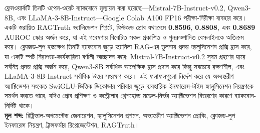 {ফ্রেমওয়ার্কটি তিনটি ওপেন-ওয়েট ব্যাকবোনে মূল্যায়ন করা হয়েছে---\textenglish{Mistral-7B-Instruct-v0.2}, \textenglish{Qwen3-8B}, এবং \textenglish{LLaMA-3-8B-Instruct}---\textenglish{Google Colab A100 FP16} পরীক্ষা-নিরীক্ষা ব্যবহার করে। একটি স্তরায়িত \textenglish{RAGTruth} ভ্যালিডেশন স্প্লিটে, ফিউজড প্রোব যথাক্রমে \textenglish{\textbf{0.8596}}, \textenglish{\textbf{0.8808}}, এবং \textenglish{\textbf{0.8689}} \textenglish{AUROC} স্কোর অর্জন করে, যা এই গবেষণায় বিবেচিত সকল প্রকাশিত ও পুনরুত্পাদিত বেসলাইনকে অতিক্রম করে। ক্লোজড-লুপ হস্তক্ষেপ তিনটি ব্যাকবোন জুড়ে ভ্যানিলা \textenglish{RAG}-এর তুলনায় প্রদত্ত হ্যালুসিনেশন প্রক্সি হ্রাস করে, যা একটি স্পষ্ট নিরাপত্তা-কার্যকারিতা বর্ণালী আচ্ছাদন করে: \textenglish{Mistral-7B-Instruct-v0.2} সুষম গ্রহণের হারে সর্বনিম্ন প্রদত্ত প্রক্সি অর্জন করে, \textenglish{Qwen3-8B} সর্বাধিক আপেক্ষিক হ্রাস প্রদান করে কিন্তু সবচেয়ে রক্ষণশীল, এবং \textenglish{LLaMA-3-8B-Instruct} সর্বাধিক উত্তর সংরক্ষণ করে। এই ফলাফলগুলো নির্দেশ করে যে অভ্যন্তরীণ অ্যাক্টিভেশন সংকেত \textenglish{SwiGLU}-ভিত্তিক ডিকোডার পরিবার জুড়ে ব্যবহারিক ইনফারেন্স-টাইম হ্যালুসিনেশন নিয়ন্ত্রণকে সমর্থন করতে পারে, যদিও প্রোব প্রশিক্ষণ ও কন্ট্রোলার থ্রেশহোল্ড মডেল-নির্ভর অ্যাক্টিভেশন বিতরণের কারণে ব্যাকবোন-নির্দিষ্ট থাকে।
\\[6pt]
\textbf{মূল শব্দ:} রিট্রিভাল-অগমেন্টেড জেনারেশন, হ্যালুসিনেশন প্রশমন, অভ্যন্তরীণ অ্যাক্টিভেশন প্রোবিং, ক্লোজড-লুপ ইনফারেন্স নিয়ন্ত্রণ, ট্রান্সফর্মার রিপ্রেজেন্টেশন, \textenglish{RAGTruth}।

}

\setcounter{secnumdepth}{1}
\clearpage
